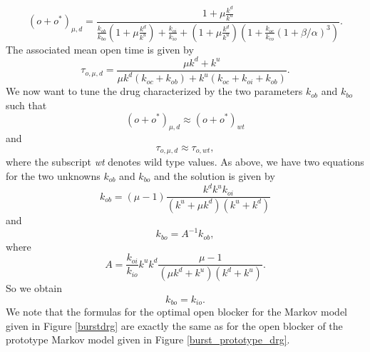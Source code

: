 \[
\left(  o+o^{\ast}\right)  _{\mu,d}=\frac{1+\mu\frac{k^{d}}{k^{u}}}
{\frac{k_{ob}}{k_{bo}}\left(  1+\mu\frac{k^{d}}{k^{u}}\right)  +\frac{k_{oi}
}{k_{io}}+\left(  1+\mu\frac{k^{d}}{k^{u}}\right)  \left(  1+\frac{k_{oc}
}{k_{co}}\left(  1+\beta/\alpha\right)  ^{3}\right)  }.
\]
The associated mean open time is given by
\begin{equation}
\tau_{o,\mu,d}=\frac{\mu k^{d}+k^{u}}{\mu k^{d}\left(  k_{oc}+k_{ob}\right)
+k^{u}\left(  k_{oc}+k_{oi}+k_{ob}\right)  }.
\end{equation}
We now want to tune the drug characterized by the two parameters $k_{ob}$
and $k_{bo}$ such that
\[
\left(  o+o^{\ast}\right)  _{\mu,d}\approx\left(  o+o^{\ast}\right)  _{wt}
\]
and
\[
\tau_{o,\mu,d}\approx\tau_{o,wt},
\]
where the subscript {\it wt} denotes wild type values. As above, we have two equations
for the two unknowns  $k_{ob}$ and $k_{bo}$ and the solution is given by
\begin{equation}
k_{ob}=\left(  \mu-1\right)  \frac{k^{d}k^{u}k_{oi}}{\left(  k^{u}+\mu
k^{d}\right)  \left(  k^{u}+k^{d}\right)  } \label{na_drug_ob}
\end{equation}
and
\begin{equation}
k_{bo}=A^{-1}k_{ob},
\end{equation}
where
\begin{equation}
A=\frac{k_{oi}}{k_{io}}k^{u}k^{d}\frac{\mu-1}{\left(  \mu k^{d}+k^{u}\right)
\left(  k^{d}+k^{u}\right)  }.
\end{equation}
So we obtain
\begin{equation}
k_{bo}=k_{io}. \label{na_drug_bo}
\end{equation}
We note that the formulas for the optimal open blocker for the Markov model
given in Figure \ref{burstdrg} are exactly the same as for the open blocker of the prototype Markov
model given in Figure \ref{burst_prototype_drg}.



